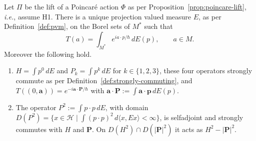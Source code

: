 \begin{proposition}\label{prop:snag-translations}
	Let $\Pi$ be the lift of a Poincar\'e action $\Phi$ as per Proposition~\ref{prop:poincare-lift}, \textit{i.e.}, assume H1. There is a unique projection valued measure $E$, as per Definition~\ref{def:pvm}, on the Borel sets of $M^*$ such that
	\begin{equation}\label{eq:translation-spectral}
		T(a)=\int_{M^*}e^{ia\cdot p/\hbar}\,dE(p), \qquad a\in M.
	\end{equation}
	Moreover the following hold.
	\begin{enumerate}
		\item $H=\int p^0\,dE$ and $P_k=\int p^k\,dE$ for $k\in\{1,2,3\}$, these four operators strongly commute as per Definition~\ref{def:strongly-commuting}, and $T((0,\mathbf{a}))=e^{-i\mathbf{a}\cdot\mathbf{P}/\hbar}$ with $\mathbf{a}\cdot\mathbf{P}:=\int\mathbf{a}\cdot\mathbf{p}\,dE(p)$.
		\item The operator $P^2:=\int p\cdot p\,dE$, with domain $D(P^2)=\{x\in\mathcal{H}\mid\int(p\cdot p)^2\,d\langle x,Ex\rangle<\infty\}$, is selfadjoint and strongly commutes with $H$ and $\mathbf{P}$. On $D(H^2)\cap D(|\mathbf{P}|^2)$ it acts as $H^2-|\mathbf{P}|^2$.
	\end{enumerate}
\end{proposition}

